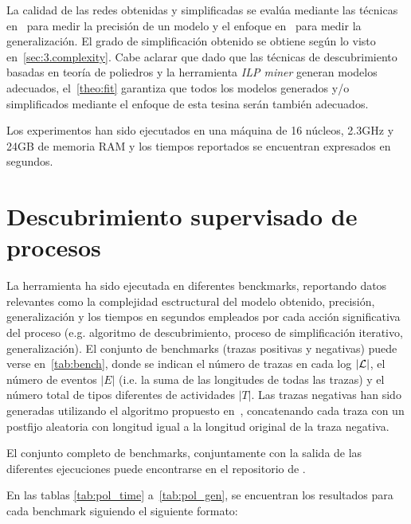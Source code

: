 La calidad de las redes obtenidas y simplificadas se evalúa mediante las técnicas en~\cite{AMCDA15} para medir
la precisión de un modelo y el enfoque en~\cite{BrouckeWVB14} para medir la generalización. El grado de
simplificación obtenido se obtiene según lo visto en~\autoref{sec:3.complexity}.
Cabe aclarar que dado que las técnicas de descubrimiento basadas en teoría de poliedros y la herramienta \textit{ILP miner}
generan modelos adecuados, el~\autoref{theo:fit} garantiza que todos los modelos generados y/o simplificados
mediante el enfoque de esta tesina serán también adecuados.

Los experimentos han sido ejecutados en una máquina de 16 núcleos, 2.3GHz y 24GB de memoria RAM y los tiempos
reportados se encuentran expresados en segundos.

\section{Descubrimiento supervisado de procesos}
\label{sec:4.supervised}



La herramienta ha sido ejecutada en diferentes benckmarks, reportando datos relevantes como la 
complejidad esctructural del modelo obtenido, precisión, generalización y los tiempos en segundos 
empleados por cada acción significativa del proceso (e.g. algoritmo de descubrimiento,
proceso de simplificación iterativo, generalización).
El conjunto de benchmarks (trazas positivas y negativas) puede verse en~\autoref{tab:bench}, donde se
indican el número de trazas en cada log $|{\mathcal L}|$, el número de eventos $|E|$ (i.e. la suma de las 
longitudes de todas las trazas) y el número total de tipos diferentes de actividades $|T|$.
Las trazas negativas han sido generadas utilizando el algoritmo propuesto en~\cite{BrouckeWVB14},
concatenando cada traza con un postfijo aleatoria con longitud igual a la longitud original de la traza
negativa.

El conjunto completo de benchmarks, conjuntamente con la salida de las diferentes ejecuciones puede 
encontrarse en el repositorio de \pachtool.

En las tablas \ref{tab:pol_time} a~\ref{tab:pol_gen}, se encuentran los resultados para cada benchmark siguiendo
el siguiente formato:


